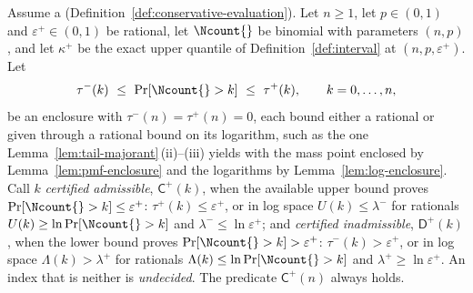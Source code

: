 \begin{proposition}\label{prop:bracketed-endpoints}
Assume a 
(Definition~\ref{def:conservative-evaluation}). Let $n\ge1$, let
$p\in(0,1)$ and $\varepsilon^{+}\in(0,1)$ be rational, let
$\Ncount{}$ be binomial with parameters $(n,p)$, and let $\kappa^{+}$ be the
exact upper quantile of Definition~\ref{def:interval} at
$(n,p,\varepsilon^{+})$. Let
\begin{equation}\label{eq:tail-enclosure}
  \tau^{-}(k)\ \le\ \Pr[\Ncount{}>k]\ \le\ \tau^{+}(k),\qquad k=0,\dots,n,
\end{equation}
be an enclosure with $\tau^{-}(n)=\tau^{+}(n)=0$, each bound either a
rational or given through a rational bound on its logarithm, such as the
one Lemma~\ref{lem:tail-majorant}\,(ii)--(iii) yields with the mass point
enclosed by Lemma~\ref{lem:pmf-enclosure} and the logarithms by
Lemma~\ref{lem:log-enclosure}. Call $k$ \emph{certified admissible},
$\mathsf{C}^{+}(k)$, when the available upper bound proves
$\Pr[\Ncount{}>k]\le\varepsilon^{+}$: $\tau^{+}(k)\le\varepsilon^{+}$, or in
log space $U(k)\le\lambda^{-}$ for rationals $U(k)\ge\ln\Pr[\Ncount{}>k]$
and $\lambda^{-}\le\ln\varepsilon^{+}$; and \emph{certified inadmissible},
$\mathsf{D}^{+}(k)$, when the lower bound proves
$\Pr[\Ncount{}>k]>\varepsilon^{+}$: $\tau^{-}(k)>\varepsilon^{+}$, or in log
space $\Lambda(k)>\lambda^{+}$ for rationals
$\Lambda(k)\le\ln\Pr[\Ncount{}>k]$ and $\lambda^{+}\ge\ln\varepsilon^{+}$.
An index that is neither is \emph{undecided}. The predicate
$\mathsf{C}^{+}(n)$ always holds.


\end{proposition}
